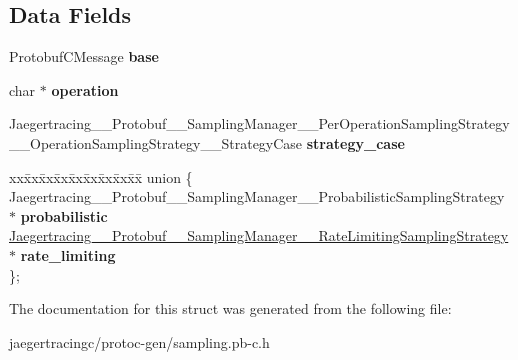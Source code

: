 \subsection*{Data Fields}
\begin{DoxyCompactItemize}
\item 
\mbox{\label{struct__Jaegertracing____Protobuf____SamplingManager____PerOperationSamplingStrategy____OperationSamplingStrategy_add0d0327453eac9421bc4f96a271d18a}} 
Protobuf\+C\+Message {\bfseries base}
\item 
\mbox{\label{struct__Jaegertracing____Protobuf____SamplingManager____PerOperationSamplingStrategy____OperationSamplingStrategy_ae3e65181bbe7873e7d7bd30083b4eb51}} 
char $\ast$ {\bfseries operation}
\item 
\mbox{\label{struct__Jaegertracing____Protobuf____SamplingManager____PerOperationSamplingStrategy____OperationSamplingStrategy_a3b268b07f41b0fbc60ebff3c8ad36d37}} 
Jaegertracing\+\_\+\+\_\+\+Protobuf\+\_\+\+\_\+\+Sampling\+Manager\+\_\+\+\_\+\+Per\+Operation\+Sampling\+Strategy\+\_\+\+\_\+\+Operation\+Sampling\+Strategy\+\_\+\+\_\+\+Strategy\+Case {\bfseries strategy\+\_\+case}
\item 
\mbox{\label{struct__Jaegertracing____Protobuf____SamplingManager____PerOperationSamplingStrategy____OperationSamplingStrategy_a069bcc0b742650991206f155e5b0f972}} 
\begin{tabbing}
xx\=xx\=xx\=xx\=xx\=xx\=xx\=xx\=xx\=\kill
union \{\\
\>Jaegertracing\_\_Protobuf\_\_SamplingManager\_\_ProbabilisticSamplingStrategy $\ast$ {\bfseries probabilistic}\\
\>\mbox{\hyperlink{struct__Jaegertracing____Protobuf____SamplingManager____RateLimitingSamplingStrategy}{Jaegertracing\_\_Protobuf\_\_SamplingManager\_\_RateLimitingSamplingStrategy}} $\ast$ {\bfseries rate\_limiting}\\
\}; \\

\end{tabbing}\end{DoxyCompactItemize}


The documentation for this struct was generated from the following file\+:\begin{DoxyCompactItemize}
\item 
jaegertracingc/protoc-\/gen/sampling.\+pb-\/c.\+h\end{DoxyCompactItemize}
